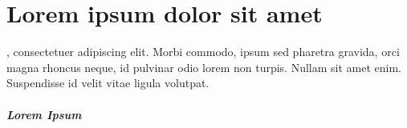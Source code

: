 \chapter{Lorem ipsum dolor sit amet}
\label{chap:conclusion}

, consectetuer adipiscing elit. Morbi commodo, ipsum sed pharetra gravida, orci magna rhoncus neque, id pulvinar odio lorem non turpis. Nullam sit amet enim. Suspendisse id velit vitae ligula volutpat.

\paragraph{Lorem Ipsum} \lipsum[2]

\lipsum[3]
